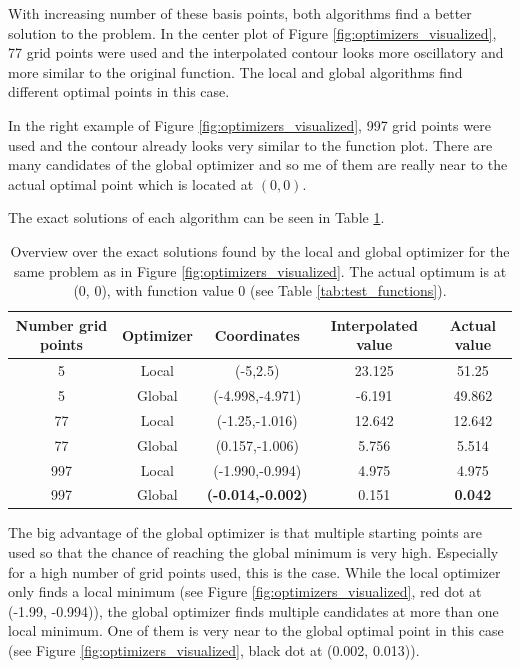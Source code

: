 With increasing number of these basis points, both algorithms find a better solution to the problem. In the center plot of Figure \ref{fig:optimizers_visualized}, 77 grid points were used and the interpolated contour looks more oscillatory and more similar to the original function. The local and global algorithms find different optimal points in this case. 

In the right example of Figure \ref{fig:optimizers_visualized}, 997 grid points were used and the contour already looks very similar to the function plot. There are many candidates of the global optimizer and so	me of them are really near to the actual optimal point which is located at $ (0, 0) $. 

The exact solutions of each algorithm can be seen in Table \ref{tab:optimizer_vis_function}.
\begin{table}[h!]
	\caption{ Overview over the exact solutions found by the local and global optimizer for the same problem as in Figure \ref{fig:optimizers_visualized}. The actual optimum is at (0, 0), with function value 0 (see Table \ref{tab:test_functions}).}
	\label{tab:optimizer_vis_function}
	\centering
	\begin{tabular}{|c c c c c|} 
		\hline
		Number grid points & Optimizer & Coordinates & Interpolated value & Actual value \\
		\hline
		5 & Local &  (-5,2.5)  &  23.125  &  51.25  \\
		5 & Global &  (-4.998,-4.971)  &  -6.191  &  49.862  \\
		77 & Local &  (-1.25,-1.016)  &  12.642  &  12.642  \\
		77 & Global &  (0.157,-1.006)  &  5.756  &  5.514  \\
		997 & Local &  (-1.990,-0.994)  &  4.975  &  4.975  \\
		997 & Global & \textbf{(-0.014,-0.002)} & 0.151 & \textbf{0.042} \\
		\hline
	\end{tabular}
\end{table}

The big advantage of the global optimizer is that multiple starting points are used so that the chance of reaching the global minimum is very high. Especially for a high number of grid points used, this is the case. While the local optimizer only finds a local minimum (see Figure \ref{fig:optimizers_visualized}, red dot at (-1.99, -0.994)), the global optimizer finds multiple candidates at more than one local minimum. One of them is very near to the global optimal point in this case (see Figure \ref{fig:optimizers_visualized}, black dot at (0.002, 0.013)). \newline 


